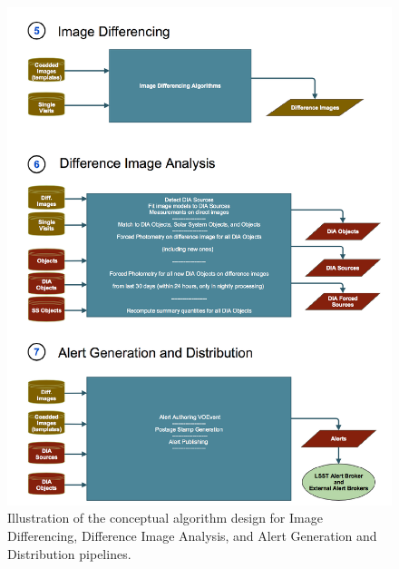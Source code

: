 \documentclass[12pt]{article}
\begin{document}
\begin{figure}[!th]
    \centering
    \vskip -0.3in
    \includegraphics[scale=0.555, angle=0]{gliffy/DifferenceImageProcessing}
    \vskip -0.1in
    \caption{Illustration of the conceptual algorithm  design for Image Differencing, Difference Image
                      Analysis, and Alert Generation and Distribution pipelines. \label{fig:Pipes567}}
\end{figure}
\end{document}
